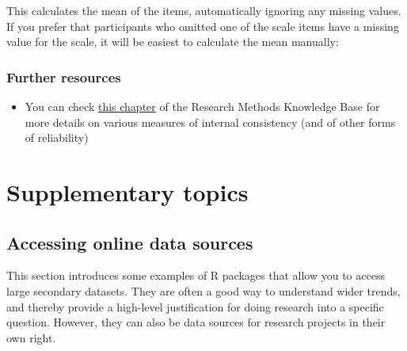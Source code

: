 \documentclass[
]{book}
\newenvironment{Shaded}{\begin{snugshade}}{\end{snugshade}}
\newcommand{\DataTypeTok}[1]{\textcolor[rgb]{0.13,0.29,0.53}{#1}}
\newcommand{\DecValTok}[1]{\textcolor[rgb]{0.00,0.00,0.81}{#1}}
\newcommand{\KeywordTok}[1]{\textcolor[rgb]{0.13,0.29,0.53}{\textbf{#1}}}
\newcommand{\NormalTok}[1]{#1}
\newcommand{\OperatorTok}[1]{\textcolor[rgb]{0.81,0.36,0.00}{\textbf{#1}}}
\newcommand{\StringTok}[1]{\textcolor[rgb]{0.31,0.60,0.02}{#1}}
\providecommand{\tightlist}{%
  \setlength{\itemsep}{0pt}\setlength{\parskip}{0pt}}
\begin{document}
This calculates the mean of the items, automatically ignoring any missing values. If you prefer that participants who omitted one of the scale items have a missing value for the scale, it will be easiest to calculate the mean manually:

\begin{Shaded}
\end{Shaded}

\hypertarget{further-resources-survey}{%
\section{Further resources}\label{further-resources-survey}}

\begin{itemize}
\tightlist
\item
  You can check \href{https://socialresearchmethods.net/kb/types-of-reliability/\#internal-consistency-reliability}{this chapter} of the Research Methods Knowledge Base for more details on various measures of internal consistency (and of other forms of reliability)
\end{itemize}

\hypertarget{part-supplementary-topics}{%
\part*{Supplementary topics}\label{part-supplementary-topics}}

\hypertarget{accessing-online-data-sources}{%
\chapter{Accessing online data sources}\label{accessing-online-data-sources}}

This section introduces some examples of R packages that allow you to access large secondary datasets. They are often a good way to understand wider trends, and thereby provide a high-level justification for doing research into a specific question. However, they can also be data sources for research projects in their own right.
\end{document}
